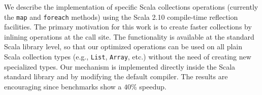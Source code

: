 We describe the implementation of specific Scala collections operations (currently the \texttt{map} and \texttt{foreach} methods) using the Scala 2.10 compile-time reflection facilities. The primary motivation for this work is to create faster collections by inlining operations at the call site. The functionality is available at the standard Scala library level, so that our optimized operations can be used on all plain Scala collection types (e.g., \texttt{List}, \texttt{Array}, etc.) without the need of creating new specialized types. Our mechanism is implemented directly inside the Scala standard library and by modifying the default compiler. The results are encouraging since benchmarks show a $40\%$ speedup.